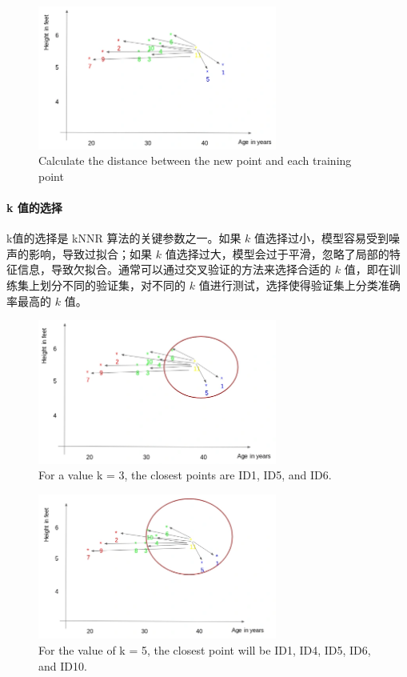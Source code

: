 \documentclass{article}
\begin{document}
\begin{figure}[H]
    \centering
    \includegraphics[width=0.7\textwidth]{Img/Screenshot-from-2018-08-22-12-49-33.png}
    \caption{Calculate the distance between the new point and each training point}
\end{figure}

\paragraph{k 值的选择}
k值的选择是 kNNR 算法的关键参数之一。如果 $k$ 值选择过小，模型容易受到噪声的影响，导致过拟合；如果 $k$ 值选择过大，模型会过于平滑，忽略了局部的特征信息，导致欠拟合。通常可以通过交叉验证的方法来选择合适的 $k$ 值，即在训练集上划分不同的验证集，对不同的 $k$ 值进行测试，选择使得验证集上分类准确率最高的 $k$ 值。

\begin{figure}[H]
    \centering
    \includegraphics[width=0.7\textwidth]{Img/Screenshot-from-2018-08-22-12-50-04.png}
    \caption{For a value k = 3, the closest points are ID1, ID5, and ID6.}
\end{figure}

\begin{figure}[H]
    \centering
    \includegraphics[width=0.7\textwidth]{Img/Screenshot-from-2018-08-22-12-50-16.png}
    \caption{For the value of k = 5, the closest point will be ID1, ID4, ID5, ID6, and ID10.}
\end{figure}
\end{document}
